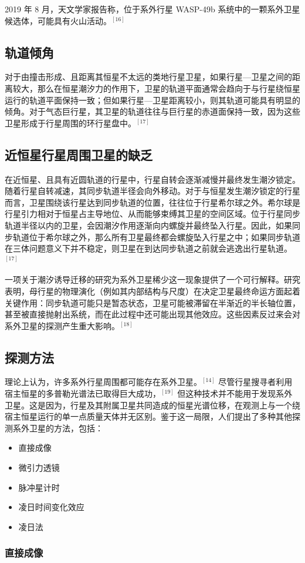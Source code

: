 2019 年 8 月，天文学家报告称，位于系外行星 WASP-49b 系统中的一颗系外卫星候选体，可能具有火山活动。$^{[16]}$
\subsection{轨道倾角}
对于由撞击形成、且距离其恒星不太远的类地行星卫星，如果行星—卫星之间的距离较大，那么在恒星潮汐力的作用下，卫星的轨道平面通常会趋向于与行星绕恒星运行的轨道平面保持一致；但如果行星—卫星距离较小，则其轨道可能具有明显的倾角。对于气态巨行星，其卫星的轨道往往与巨行星的赤道面保持一致，因为这些卫星形成于行星周围的环行星盘中。$^{[17]}$
\subsection{近恒星行星周围卫星的缺乏}
在近恒星、且具有近圆轨道的行星中，行星自转会逐渐减慢并最终发生潮汐锁定。随着行星自转减速，其同步轨道半径会向外移动。对于与恒星发生潮汐锁定的行星而言，卫星围绕该行星达到同步轨道的位置，往往位于行星希尔球之外。希尔球是行星引力相对于恒星占主导地位、从而能够束缚其卫星的空间区域。位于行星同步轨道半径以内的卫星，会因潮汐作用逐渐向内螺旋并最终坠入行星。因此，如果同步轨道位于希尔球之外，那么所有卫星最终都会螺旋坠入行星之中；如果同步轨道在三体问题意义下并不稳定，则卫星在到达同步轨道之前就会逃逸出行星轨道。$^{[17]}$

一项关于潮汐诱导迁移的研究为系外卫星稀少这一现象提供了一个可行解释。研究表明，母行星的物理演化（例如其内部结构与尺度）在决定卫星最终命运方面起着关键作用：同步轨道可能只是暂态状态，卫星可能被滞留在半渐近的半长轴位置，甚至被直接抛射出系统，而在此过程中还可能出现其他效应。这些因素反过来会对系外卫星的探测产生重大影响。$^{[18]}$
\subsection{探测方法}
理论上认为，许多系外行星周围都可能存在系外卫星。$^{[14]}$ 尽管行星搜寻者利用宿主恒星的多普勒光谱法已取得巨大成功，$^{[19]}$ 但这种技术并不能用于发现系外卫星。这是因为，行星及其附属卫星共同造成的恒星光谱位移，在观测上与一个绕宿主恒星运行的单一点质量天体并无区别。鉴于这一局限，人们提出了多种其他探测系外卫星的方法，包括：
\begin{itemize}
\item 直接成像
\item 微引力透镜
\item 脉冲星计时
\item 凌日时间变化效应
\item 凌日法
\end{itemize}
\subsubsection{直接成像}

